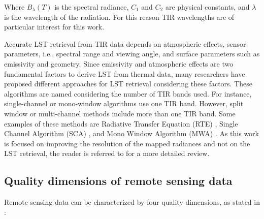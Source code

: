         Where $B_{\lambda}(T)$ is the spectral radiance, $C_1$ and $C_2$ are physical constants, and $\lambda$ is the wavelength of the radiation. 
        For this reason TIR wavelengths are of particular interest for this work.

        Accurate LST retrieval from TIR data depends on atmospheric effects, sensor parameters, i.e., spectral range and viewing angle, and surface parameters such as emissivity and geometry.
        Since emissivity and atmospheric effects are two fundamental factors to derive LST from thermal data, many researchers have proposed different approaches for LST retrieval considering these factors.
        These algorithms are named considering the number of TIR bands used. For instance, single-channel or mono-window algorithms use one TIR band. However, split window or multi-channel methods include more than one TIR band.
        Some examples of these methods are Radiative Transfer Equation (RTE) \cite{becker90}, Single Channel Algorithm (SCA) \cite{sca2009}, and Mono Window Algorithm (MWA) \cite{mwa2001}.
        As this work is focused on improving the resolution of the mapped radiances and not on the LST retrieval, the reader is referred to \cite{LI201314} for a more detailed review.

    \subsection{Quality dimensions of remote sensing data}

    Remote sensing data can be characterized by four quality dimensions, as stated in \cite{HORNING20082986}:

